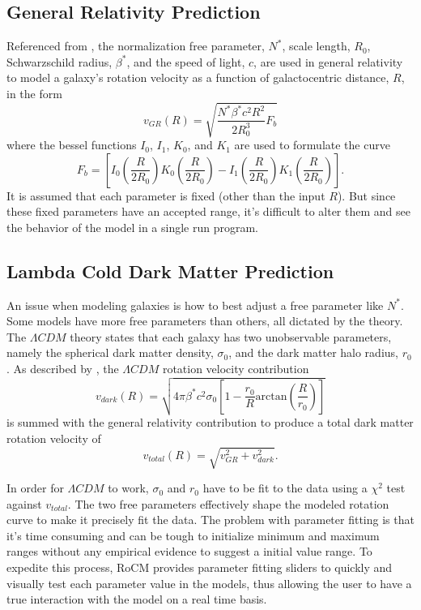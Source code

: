 \documentclass[conference]{IEEEtran-modified}
\begin{document}
\subsection{General Relativity Prediction}

Referenced from \cite{mannheim}, the normalization free parameter, $N^*$, scale length, $R_0$, Schwarzschild radius, $\beta^*$, and the speed of light, $c$, are used in general relativity to model a galaxy's rotation velocity as a function of galactocentric distance, $R$, in the form
\begin{equation}
v_{GR}(R) = \sqrt{\frac{N^*\beta^*c^2R^2}{2R^3_0}F_b}
\end{equation}
where the bessel functions $I_0$, $I_1$, $K_0$, and $K_1$ are used to formulate the curve
\begin{equation}
F_b = \left[I_0\left(\frac{R}{2R_0}\right)K_0\left(\frac{R}{2R_0}\right)-I_1\left(\frac{R}{2R_0}\right)K_1\left(\frac{R}{2R_0}\right)\right].
\end{equation}
It is assumed that each parameter is fixed (other than the input $R$). But since these fixed parameters have an accepted range, it's difficult to alter them and see the behavior of the model in a single run program.   


\subsection{Lambda Cold Dark Matter Prediction}
An issue when modeling galaxies is how to best adjust a free parameter like $N^*$. Some models have more free parameters than others, all dictated by the theory. The $\Lambda CDM$ theory states that each galaxy has two unobservable parameters, namely the spherical dark matter density, $\sigma_0$, and the dark matter halo radius, $r_0$. As described by \cite{mannheim}, the $\Lambda CDM$ rotation velocity contribution
\begin{equation}
v_{dark}(R) = \sqrt{4\pi\beta^*c^2\sigma_0\left[1-\frac{r_0}{R}\text{arctan}\left(\frac{R}{r_0}\right)\right]}
\end{equation}
is summed with the general relativity contribution to produce a total dark matter rotation velocity of 
\begin{equation}
v_{total}(R) = \sqrt{v_{GR}^2 + v_{dark}^2}.
\end{equation}

In order for $\Lambda CDM$ to work, $\sigma_0$ and $r_0$ have to be fit to the data using a $\chi^2$ test against $v_{total}$. The two free parameters effectively shape the modeled rotation curve to make it precisely fit the data. The problem with parameter fitting is that it's time consuming and can be tough to initialize minimum and maximum ranges without any empirical evidence to suggest a initial value range. To expedite this process, RoCM provides parameter fitting sliders to quickly and visually test each parameter value in the models, thus allowing the user to have a true interaction with the model on a real time basis.
\end{document}
